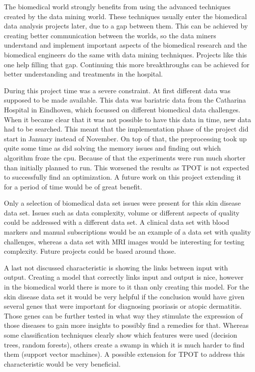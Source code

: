 \documentclass[10pt,a4paper]{article}
\begin{document}
	The biomedical world strongly benefits from using the advanced techniques created by the data mining world. These techniques usually enter the biomedical data analysis projects later, due to a gap between them. This can be achieved by creating better communication between the worlds, so the data miners understand and implement important aspects of the biomedical research and the biomedical engineers do the same with data mining techniques. Projects like this one help filling that gap. Continuing this more breakthroughs can be achieved for better understanding and treatments in the hospital.
	
	During this project time was a severe constraint. At first different data was supposed to be made available. This data was bariatric data from the Catharina Hospital in Eindhoven, which focussed on different biomedical data challenges.\cite{Deneer2017Thesis} When it became clear that it was not possible to have this data in time, new data had to be searched. This meant that the implementation phase of the project did start in January instead of November. On top of that, the preprocessing took up quite some time as did solving the memory issues and finding out which algorithm froze the cpu. Because of that the experiments were run much shorter than initially planned to run. This worsened the results as TPOT is not expected to successfully find an optimization. A future work on this project extending it for a period of time would be of great benefit.
	
	Only a selection of biomedical data set issues were present for this skin disease data set. Issues such as data complexity, volume or different aspects of quality could be addressed with a different data set. A clinical data set with blood markers and manual subscriptions would be an example of a data set with quality challenges, whereas a data set with MRI images would be interesting for testing complexity. Future projects could be based around those.
	
	A last not discussed characteristic is showing the links between input with output. Creating a model that correctly links input and output is nice, however in the biomedical world there is more to it than only creating this model. For the skin disease data set it would be very helpful if the conclusion would have given several genes that were important for diagnosing psoriasis or atopic dermatitis. Those genes can be further tested in what way they stimulate the expression of those diseases to gain more insights to possibly find a remedies for that. Whereas some classification techniques clearly show which features were used (decision trees, random forests), others create a swamp in which it is much harder to find them (support vector machines). A possible extension for TPOT to address this characteristic would be very beneficial.
	
	 
	
	
\end{document}
